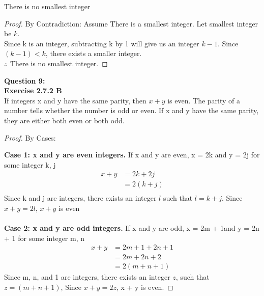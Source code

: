 \documentclass[11pt]{article}
\begin{document}
\noindent There is no smallest integer\\
\begin{proof}
By Contradiction: Assume There is a smallest integer. Let smallest integer be $k$.\\
Since k is an integer, subtracting k by 1 will give us an integer $k-1$. Since $(k - 1) < k$,  there exists a smaller integer.\\ $\therefore$ There is no smallest integer.

\end{proof}

\newpage

\noindent \textbf{Question 9:}\\
\textbf{Exercise 2.7.2 B}\\

\noindent If integers x and y have the same parity, then $x + y$ is even. The parity of a number tells whether the number is odd or even. If x and y have the same parity, they are either both even or both odd.\\

\begin{proof}
By Cases:

\noindent \textbf{Case 1:  x and y are even integers.} If x and y are even, x = 2k and y = 2j for some integer k, j\\
\begin{align*}
x + y &= 2k + 2j\\
&= 2(k + j)\\
\end{align*}
Since k and j are integers, there exists an integer $l$ such that $l = k + j$. Since $x + y = 2l$, $x + y$ is even\\\\

\noindent \textbf{Case 2:  x and y are odd integers.} If x and y are odd, x = 2m + 1and y = 2n + 1 for some integer m, n\\
\begin{align*}
x + y &= 2m + 1 + 2n + 1\\
&= 2m + 2n + 2\\
&= 2(m + n + 1)
\end{align*}
Since m, n, and 1 are integers, there exists an integer $z$, such that $z = (m + n + 1)$, Since $x + y = 2z$, x + y is even.
\end{proof}
\end{document}
